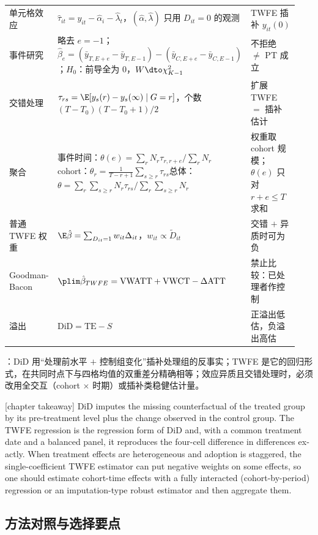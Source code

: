 {\begin{longtable}{@{}p{0.17\linewidth}p{0.50\linewidth}p{0.27\linewidth}@{}}
单元格效应 & $\hat\tau_{it}=y_{it}-\hat\alpha_i-\hat\lambda_t$，$(\hat\alpha,\hat\lambda)$ 只用 $D_{it}=0$ 的观测 & TWFE 插补 $y_{it}(0)$\\
事件研究 & 略去 $e=-1$；$\hat\beta_e=(\bar y_{T,E+e}-\bar y_{T,E-1})-(\bar y_{C,E+e}-\bar y_{C,E-1})$；$H_0$：前导全为 0，$W\dto\chi^2_{K-1}$ & 不拒绝 $\ne$ PT 成立\\
交错处理 & $\tau_{rs}=\E[y_s(r)-y_s(\infty)\mid G=r]$，个数 $(T-T_0)(T-T_0+1)/2$ & 扩展 TWFE $=$ 插补估计\\
聚合 & 事件时间：$\theta(e)=\sum_rN_r\tau_{r,r+e}\big/\sum_rN_r$\newline cohort：$\theta_r=\frac{1}{T-r+1}\sum_{s\ge r}\tau_{rs}$\newline 总体：$\theta=\sum_r\sum_{s\ge r}N_r\tau_{rs}\big/\sum_r\sum_{s\ge r}N_r$ & 权重取 cohort 规模；$\theta(e)$ 只对 $r+e\le T$ 求和\\
普通 TWFE 权重 & $\E\hat\beta=\sum_{D_{it}=1}w_{it}\Delta_{it}$，$w_{it}\propto\tilde D_{it}$ & 交错 $+$ 异质时可为负\\
Goodman-Bacon & $\plim\hat\beta_{TWFE}=\mathrm{VWATT}+\mathrm{VWCT}-\Delta\mathrm{ATT}$ & 禁止比较：已处理者作控制\\
溢出 & $\mathrm{DiD}=\mathrm{TE}-S$ & 正溢出低估，负溢出高估\\
\end{longtable}
}

\noindent{}：DiD 用“处理前水平 $+$ 控制组变化”插补处理组的反事实；TWFE 是它的回归形式，在共同时点下与四格均值的双重差分精确相等；效应异质且交错处理时，必须改用全交互（cohort $\times$ 时期）或插补类稳健估计量。

\begin{english}[chapter takeaway]
DiD imputes the missing counterfactual of the treated group by its pre-treatment level plus the change observed in the control group. The TWFE regression is the regression form of DiD and, with a common treatment date and a balanced panel, it reproduces the four-cell difference in differences exactly. When treatment effects are heterogeneous and adoption is staggered, the single-coefficient TWFE estimator can put negative weights on some effects, so one should estimate cohort-time effects with a fully interacted (cohort-by-period) regression or an imputation-type robust estimator and then aggregate them.
\end{english}

\subsection{方法对照与选择要点}

